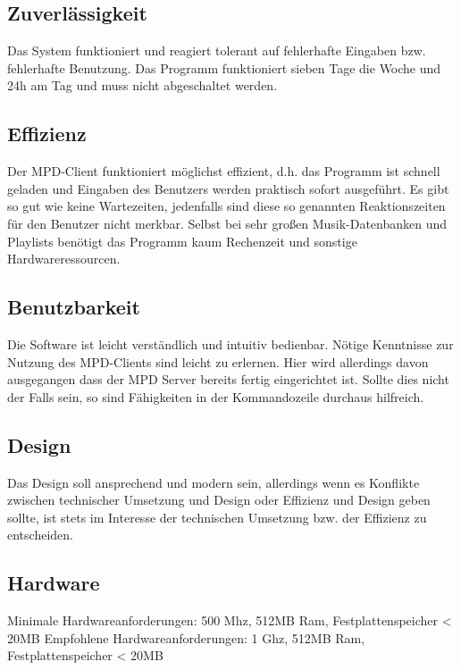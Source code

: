 \subsection{Zuverlässigkeit}
Das System funktioniert und reagiert tolerant auf fehlerhafte Eingaben bzw. fehlerhafte Benutzung.
Das Programm funktioniert sieben Tage die Woche und 24h am Tag und muss nicht abgeschaltet werden.

\subsection{Effizienz}
Der MPD-Client funktioniert möglichst effizient, d.h. das Programm ist schnell geladen und Eingaben des Benutzers
werden praktisch sofort ausgeführt. Es gibt so gut wie keine Wartezeiten, jedenfalls sind diese 
so genannten Reaktionszeiten für den Benutzer nicht merkbar. Selbst bei sehr großen Musik-Datenbanken
und Playlists benötigt das Programm kaum Rechenzeit und sonstige Hardwareressourcen.

\subsection{Benutzbarkeit}
Die Software ist leicht verständlich und intuitiv bedienbar. Nötige Kenntnisse zur Nutzung des 
MPD-Clients sind leicht zu erlernen. Hier wird allerdings davon ausgegangen dass der MPD Server bereits
fertig eingerichtet ist. Sollte dies nicht der Falls sein, so sind Fähigkeiten in der Kommandozeile 
durchaus hilfreich.

\subsection{Design}
Das Design soll ansprechend und modern sein, allerdings wenn es Konflikte zwischen technischer Umsetzung 
und Design oder Effizienz und Design geben sollte, ist stets im Interesse der technischen Umsetzung bzw. 
der Effizienz zu entscheiden.

\subsection{Hardware}
Minimale Hardwareanforderungen: 500 Mhz, 512MB Ram, Festplattenspeicher < 20MB
Empfohlene Hardwareanforderungen: 1 Ghz, 512MB Ram, Festplattenspeicher < 20MB


